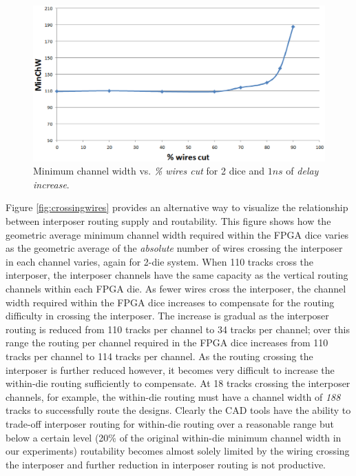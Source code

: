 \documentclass[journal]{IEEEtran}
\begin{document}
\begin{figure}[!htbp]
\centering
\includegraphics[width=\linewidth]{minChW.eps}
\caption{Minimum channel width vs. \textit{\% wires cut} for 2 dice and $1ns$ of \textit{delay increase}.}
\label{fig:standard_minW}
\end{figure}

Figure \ref{fig:crossingwires} provides an alternative way to visualize the relationship between interposer routing supply and routability. This figure shows how the geometric average minimum channel width required within the FPGA dice varies as the geometric average of the \emph{absolute} number of wires crossing the interposer in each channel varies, again for 2-die system. When 110 tracks cross the interposer, the interposer channels have the same capacity as the vertical routing channels within each FPGA die. As fewer wires cross the interposer, the channel width required within the FPGA dice increases to compensate for the routing difficulty in crossing the interposer. The increase is gradual as the interposer routing is reduced from 110 tracks per channel to 34 tracks per channel; over this range the routing per channel required in the FPGA dice increases from 110 tracks per channel to 114 tracks per channel. As the routing crossing the interposer is further reduced however, it becomes very difficult to increase the within-die routing sufficiently to compensate. At 18 tracks crossing the interposer channels, for example, the within-die routing must have a channel width of \emph{188} tracks to successfully route the designs. Clearly the CAD tools have the ability to trade-off interposer routing for within-die routing over a reasonable range but below a certain level (20\% of the original within-die minimum channel width in our experiments) routability becomes almost solely limited by the wiring crossing the interposer and further reduction in interposer routing is not productive.
\end{document}
